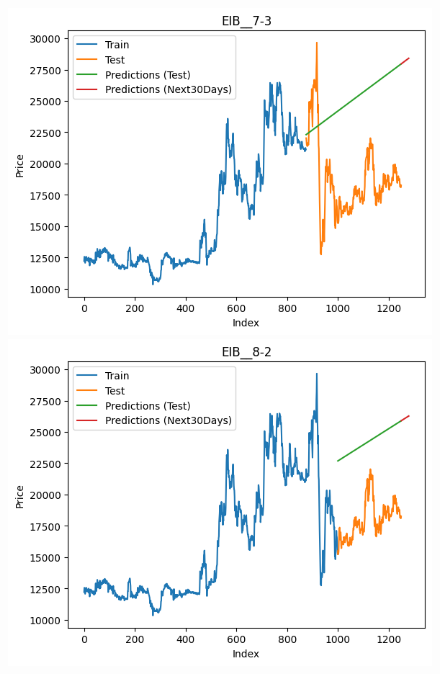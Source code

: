 \begin{figure}[H]
\begin{minipage}{0.15\textwidth}
    \includegraphics[width=1\textwidth]{resources/chapter-5/result/EIB_LinearRegression_7-3.png}
    \end{minipage}
    \hfill
    \begin{minipage}{0.15\textwidth}
    \centering
    \includegraphics[width=1\textwidth]{resources/chapter-5/result/EIB_LinearRegression_8-2.png}
    \end{minipage}
    \hfill
        \begin{minipage}{0.15\textwidth}
    \centering

\end{minipage}
\end{figure}
